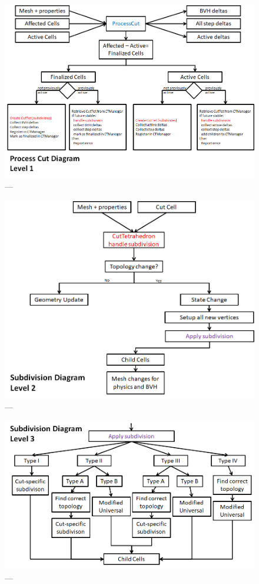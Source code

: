 \begin{figure}
  \centering%
  \includegraphics[width=0.85\linewidth]{figures/cutting/Process_cut_details.png}
  \caption{---}\label{fig:Process_cut_details_flow}
\end{figure}


\begin{figure}
  \centering%
  \includegraphics[width=0.85\linewidth]{figures/cutting/cuttetrahedron.png}
  \caption{---}\label{fig:CutTetrahedron_flow}
\end{figure}


\begin{figure}
  \centering%
  \includegraphics[width=0.85\linewidth]{figures/cutting/subdivision.png}
  \caption{---}\label{fig:Subdivision_flow}
\end{figure}


